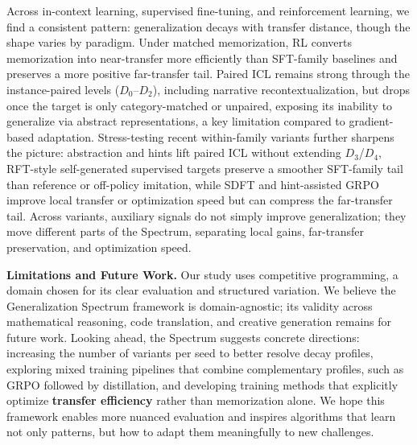 \documentclass[]{bytedance_seed}
\theoremstyle{plain}
\theoremstyle{definition}
\theoremstyle{remark}
\begin{document}
Across in-context learning, supervised fine-tuning, and reinforcement learning, we find a consistent pattern: generalization decays with transfer distance, though the shape varies by paradigm. Under matched memorization, RL converts memorization into near-transfer more efficiently than SFT-family baselines and preserves a more positive far-transfer tail. Paired ICL remains strong through the instance-paired levels ($D_0$--$D_2$), including narrative recontextualization, but drops once the target is only category-matched or unpaired, exposing its inability to generalize via abstract representations, a key limitation compared to gradient-based adaptation. Stress-testing recent within-family variants further sharpens the picture: abstraction and hints lift paired ICL without extending $D_3$/$D_4$, RFT-style self-generated supervised targets preserve a smoother SFT-family tail than reference or off-policy imitation, while SDFT and hint-assisted GRPO improve local transfer or optimization speed but can compress the far-transfer tail. Across variants, auxiliary signals do not simply improve generalization; they move different parts of the Spectrum, separating local gains, far-transfer preservation, and optimization speed.

\textbf{Limitations and Future Work.} Our study uses competitive programming, a domain chosen for its clear evaluation and structured variation. We believe the Generalization Spectrum framework is domain-agnostic; its validity across mathematical reasoning, code translation, and creative generation remains for future work. Looking ahead, the Spectrum suggests concrete directions: increasing the number of variants per seed to better resolve decay profiles, exploring mixed training pipelines that combine complementary profiles, such as GRPO followed by distillation, and developing training methods that explicitly optimize \textbf{transfer efficiency} rather than memorization alone. We hope this framework enables more nuanced evaluation and inspires algorithms that learn not only patterns, but how to adapt them meaningfully to new challenges.
\end{document}
